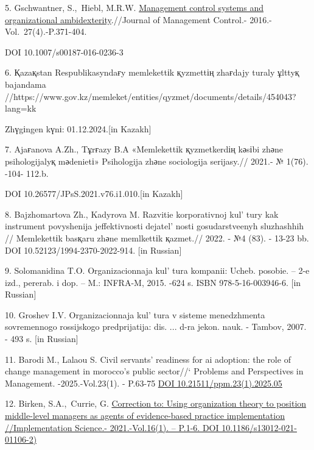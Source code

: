5. Gschwantner, S.,~Hiebl, M.R.W.
\href{https://www.scopus.com/record/display.uri?eid=2-s2.0-84978811157&origin=reflist&sort=plf-f&src=s&sid=9294c12779ee47479a1a0997e8991897&sot=b&sdt=b&sl=99&s=TITLE\%28An+Examination+of+Civil+Servants\%e2\%80\%99+Assessment+of++the+New+Civil+Service+Reforms+in+Kazakhstan\%29}{Management
control systems and organizational ambidexterity}.//Journal of
Management Control.- 2016.- Vol.~27(4).-P.371-404.~

DOI 10.1007/s00187-016-0236-3

6. Қazaқstan Respublikasyndaғy memlekettіk қyzmettің zhaғdajy turaly
ұlttyқ bajandama
//https://www.gov.kz/memleket/entities/qyzmet/documents/details/454043?lang=kk

Zhүgіngen kүnі: 01.12.2024.{[}in Kazakh{]}

7. Ajaғanova A.Zh., Tұrғazy B.A «Memlekettіk қyzmetkerdің kәsіbi zhәne
psihologijalyқ mәdenietі» Psihologija zhәne sociologija serijasy.//
2021.- № 1(76). -104- 112.b.

DOI 10.26577/JPsS.2021.v76.i1.010.{[}in Kazakh{]}

8. Bajzhomartova Zh., Kadyrova M. Razvitie korporativnoj
kul' tury kak instrument povyshenija jeffektivnosti
dejatel' nosti gosudarstveenyh sluzhashhih // Memlekettіk
basқaru zhәne memlkettіk қazmet.// 2022. - №4 (83). - 13-23 bb. DOI
10.52123/1994-2370-2022-914. {[}in Russian{]}

9. Solomanidina T.O. Organizacionnaja kul' tura kompanii:
Ucheb. posobie. -- 2-e izd., pererab. i dop. -- M.: INFRA-M, 2015. -624
s. ISBN 978-5-16-003946-6. {[}in Russian{]}

10. Groshev I.V. Organizacionnaja kul' tura v sisteme
menedzhmenta sovremennogo rossijskogo predprijatija: dis. ... d-ra
jekon. nauk. - Tambov, 2007. - 493 s. {[}in Russian{]}

11. Barodi M., Lalaou S. Civil servants' readiness for ai adoption: the
role of change management in morocco's public sector//` Problems and
Perspectives in Management. -2025.-Vol.23(1). - P.63-75
\href{http://dx.doi.org/10.21511/ppm.23(1).2025.05}{DOI
10.21511/ppm.23(1).2025.05}

12. Birken, S.A.,~Currie, G.
\href{https://www.scopus.com/record/display.uri?eid=2-s2.0-85104625356&origin=reflist&sort=plf-f&src=s&sid=9294c12779ee47479a1a0997e8991897&sot=b&sdt=b&sl=99&s=TITLE\%28An+Examination+of+Civil+Servants\%e2\%80\%99+Assessment+of++the+New+Civil+Service+Reforms+in+Kazakhstan\%29}{Correction
to: Using organization theory to position middle-level managers as
agents of evidence-based practice implementation //Implementation
Science.- 2021.-Vol.16(1). -- P.1-6. DOI 10.1186/s13012-021-01106-2)}


